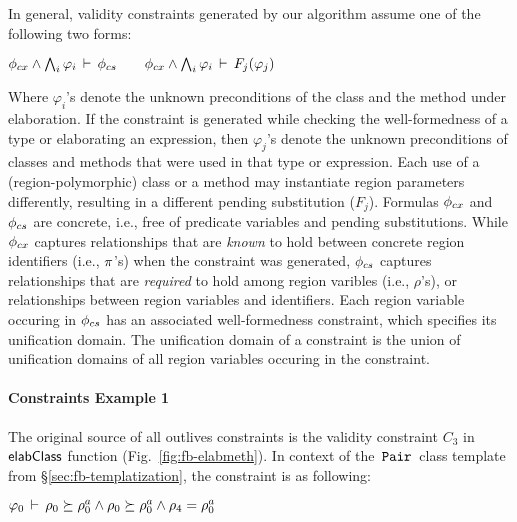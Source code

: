In general, validity constraints generated by our algorithm assume one
of the following two forms:
\begin{center}
\( \phi_{cx} \wedge \bigwedge_{i}\varphi_i\,\vdash\,\phi_{cs} \qquad
   \phi_{cx} \wedge \bigwedge_{i}\varphi_i\,\vdash\,F_j(\varphi_j)
\)
\end{center}
Where $\varphi_i$'s denote the unknown preconditions of the class and
the method under elaboration. If the constraint is generated while
checking the well-formedness of a type or elaborating an expression,
then $\varphi_j$'s denote the unknown preconditions of classes and
methods that were used in that type or expression.  Each use of a
(region-polymorphic) class or a method may instantiate region
parameters differently, resulting in a different pending substitution
($F_j$). Formulas $\phi_{cx}$ and $\phi_{cs}$ are concrete, i.e., free
of predicate variables and pending substitutions. While $\phi_{cx}$
captures relationships that are \emph{known} to hold between concrete
region identifiers (i.e., $\pi$'s) when the constraint was generated,
$\phi_{cs}$ captures relationships that are \emph{required} to hold
among region varibles (i.e., $\rho$'s), or relationships between
region variables and identifiers. Each region variable occuring in
$\phi_{cs}$ has an associated well-formedness constraint, which
specifies its unification domain. The unification domain of a
constraint is the union of unification domains of all region variables
occuring in the constraint.

\paragraph{Constraints Example 1} The original source of all
outlives constraints is the validity constraint $C_3$ in ${\sf elabClass}$
function (Fig.~\ref{fig:fb-elabmeth}). In context of the $\,{\tt Pair}\,$
class template from \S\ref{sec:fb-templatization}, the constraint is
as following:
\begin{center}
  \(\varphi_0\,\vdash\,\rho_0 \succeq \rho^a_0 \wedge \rho_0
  \succeq \rho^a_0 \wedge \rho_4 = \rho^a_0\)
\end{center}

